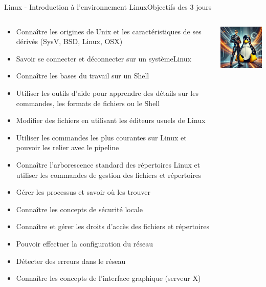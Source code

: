 \documentclass{beamer}
\begin{document}
    \begin{frame}{Linux - Introduction à l'environnement Linux}{Objectifs des 3 jours}
        \begin{columns}
            \begin{scriptsize}
                \begin{itemize}
                    \item Connaître les origines de Unix et les caractéristiques de ses dérivés (SysV, BSD, Linux, OSX)
                    \item Savoir se connecter et déconnecter sur un systèmeLinux
                    \item Connaître les bases du travail sur un Shell
                    \item Utiliser les outils d'aide pour apprendre des détails sur les commandes, les formats de fichiers ou le Shell
                    \item Modifier des fichiers en utilisant les éditeurs usuels de Linux
                    \item Utiliser les commandes les plus courantes sur Linux et pouvoir les relier avec le pipeline
                    \item Connaître l'arborescence standard des répertoires Linux et utiliser les commandes de gestion des fichiers et répertoires
                    \item Gérer les processus et savoir où les trouver
                    \item Connaître les concepts de sécurité locale
                    \item Connaître et gérer les droits d'accès des fichiers et répertoires
                    \item Pouvoir effectuer la configuration du réseau
                    \item Détecter des erreurs dans le réseau
                    \item Connaître les concepts de l'interface graphique (serveur X)
                \end{itemize}
            \end{scriptsize}
            \includegraphics[width=4cm]{image/IT-man-and-penguin}
        \end{columns}
    \end{frame}
\end{document}
